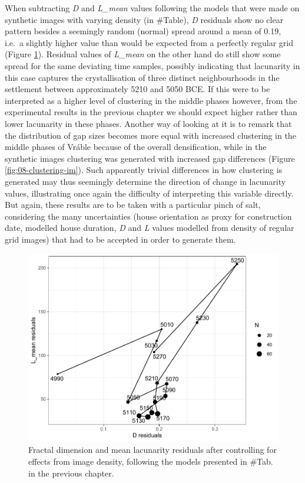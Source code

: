 \documentclass[
  12pt,
]{book}
\begin{document}
When subtracting \emph{D} and \emph{L\_mean} values following the models that were made on synthetic images with varying density (in \#Table), \emph{D} residuals show no clear pattern besides a seemingly random (normal) spread around a mean of 0.19, i.e.~a slightly higher value than would be expected from a perfectly regular grid (Figure \ref{fig:09-time-resid}). Residual values of \emph{L\_mean} on the other hand do still show some spread for the same deviating time samples, possibly indicating that lacunarity in this case captures the crystallisation of three distinct neighbourhoods in the settlement between approximately 5210 and 5050 BCE. If this were to be interpreted as a higher level of clustering in the middle phases however, from the experimental results in the previous chapter we should expect higher rather than lower lacunarity in these phases. Another way of looking at it is to remark that the distribution of gap sizes becomes more equal with increased clustering in the middle phases of Vráble because of the overall densification, while in the synthetic images clustering was generated with increased gap differences (Figure \ref{fig:08-clustering-im}). Such apparently trivial differences in how clustering is generated may thus seemingly determine the direction of change in lacunarity values, illustrating once again the difficulty of interpreting this variable directly. But again, these results are to be taken with a particular pinch of salt, considering the many uncertainties (house orientation as proxy for construction date, modelled house duration, \emph{D} and \emph{L} values modelled from density of regular grid images) that had to be accepted in order to generate them.



\begin{figure}

{\centering \includegraphics[width=0.9\linewidth]{bookdown-demo_files/figure-latex/09-time-resid-1} 

}

\caption{Fractal dimension and mean lacunarity residuals after controlling for effects from image density, following the models presented in \#Tab. in the previous chapter.}\label{fig:09-time-resid}
\end{figure}
\end{document}

